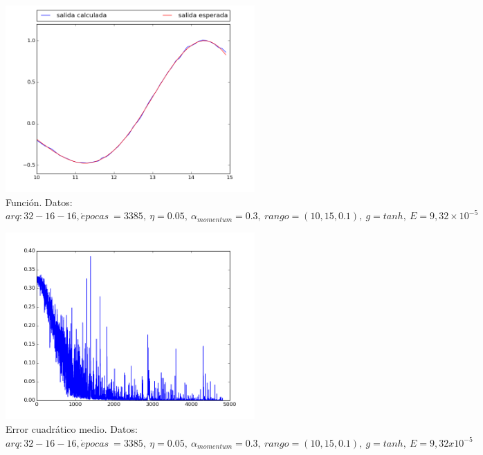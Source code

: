 \documentclass[12pt,a4paper]{article}
\begin{document}
\begin{figure}[H]
\centering
\includegraphics[width=0.85\textwidth]{img/_32__16__16_-eta_0_05-1430817237_7846918-FUNCTION.png}
\caption{\label{fig:test10-15-tanh-fn-32-momentum} Función. Datos:  $arq: 32-16-16, \acute{e} pocas \ = 3385, \ \eta = 0.05, \ \alpha_{momentum} = 0.3, \ rango=(10, 15, 0.1),\ g=tanh, \ E =9,32 \times 10^{-5}$}
\end{figure}

\begin{figure}[H]
\centering
\includegraphics[width=0.85\textwidth]{img/_32__16__16_-eta_0_05-1430817237_7846918-ERROR.png}
\caption{\label{fig:test10-15-tanh-error-32-momentum} Error cuadrático medio. Datos:  $arq: 32-16-16, \acute{e} pocas \ = 3385, \ \eta = 0.05, \ \alpha_{momentum} = 0.3, \ rango=(10, 15, 0.1),\ g=tanh, \ E =9,32 x 10^{-5}$}
\end{figure}
\end{document}
